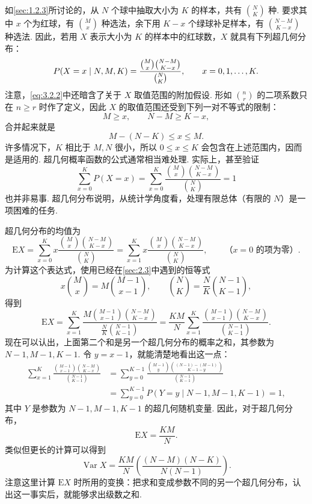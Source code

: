 如\autoref{sec:1.2.3}所讨论的，从 $N$ 个球中抽取大小为 $K$ 的样本，共有 $\binom NK$ 种. 要求其中 $x$ 个为红球，有 $\binom Mx$ 种选法，余下用 $K-x$ 个绿球补足样本，有 $\binom{N-M}{K-x}$ 种选法. 因此，若用 $X$ 表示大小为 $K$ 的样本中的红球数，$X$ 就具有下列超几何分布：
\begin{equation}\label{eq:3.2.2}\index{SI0323@超几何}
P(X=x\mid N,M,K)=\frac{\binom Mx\binom{N-M}{K-x}}{\binom NK},\qquad x=0,1,\ldots,K.
\end{equation}
注意，\eqref{eq:3.2.2}中还暗含了关于 $X$ 取值范围的附加假设. 形如 $\binom nr$ 的二项系数只在 $n\ge r$ 时作了定义，因此 $X$ 的取值范围还受到下列一对不等式的限制：
$$M\ge x,\qquad N-M\ge K-x,$$
合并起来就是
$$M-(N-K)\le x\le M.$$
许多情况下，$K$ 相比于 $M,N$ 很小，所以 $0\le x\le K$ 会包含在上述范围内，因而是适用的. 超几何概率函数的公式通常相当难处理. 实际上，甚至验证
$$\sum_{x=0}^K P(X=x)=\sum_{x=0}^K\frac{\binom Mx\binom{N-M}{K-x}}{\binom NK}=1$$
也并非易事.
超几何分布说明，从统计学角度看，处理有限总体（有限的 $N$）是一项困难的任务.

超几何分布的均值为
$$\mathrm EX=\sum_{x=0}^K x\frac{\binom Mx\binom{N-M}{K-x}}{\binom NK}
=\sum_{x=1}^K x\frac{\binom Mx\binom{N-M}{K-x}}{\binom NK},\qquad\text{（$x=0$ 的项为零）}.$$
为计算这个表达式，使用已经在\autoref{sec:2.3}中遇到的恒等式
$$x\binom Mx=M\binom{M-1}{x-1},\qquad
\binom NK=\frac NK\binom{N-1}{K-1},$$
得到
$$\mathrm EX=\sum_{x=1}^K\frac{M\binom{M-1}{x-1}\binom{N-M}{K-x}}{\frac NK\binom{N-1}{K-1}}
=\frac{KM}N\sum_{x=1}^K\frac{\binom{M-1}{x-1}\binom{N-M}{K-x}}{\binom{N-1}{K-1}}.$$
现在可以认出，上面第二个和是另一个超几何分布的概率之和，其参数为 $N-1,M-1,K-1$. 令 $y=x-1$，就能清楚地看出这一点：
$$\begin{aligned}
\sum_{x=1}^K\frac{\binom{M-1}{x-1}\binom{N-M}{K-x}}{\binom{N-1}{K-1}}
&=\sum_{y=0}^{K-1}\frac{\binom{M-1}y\binom{(N-1)-(M-1)}{K-1-y}}{\binom{N-1}{K-1}}\\
&=\sum_{y=0}^{K-1}P(Y=y\mid N-1,M-1,K-1)=1,
\end{aligned}$$
其中 $Y$ 是参数为 $N-1,M-1,K-1$ 的超几何随机变量. 因此，对于超几何分布，
$$\mathrm EX=\frac{KM}N.$$
类似但更长的计算可以得到
$$\operatorname{Var}X=\frac{KM}N\left(\frac{(N-M)(N-K)}{N(N-1)}\right).$$
注意这里计算 $\mathrm EX$ 时所用的变换：把求和变成参数不同的另一个超几何分布，认出这一事实后，就能够求出级数之和.

